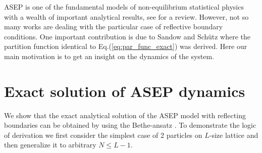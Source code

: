 \documentclass[aps,showpacs,twocolumn,floatfix,prx,superscriptaddress]{revtex4-1}
\begin{document}
ASEP is one of the fundamental models of non-equilibrium statistical physics with a wealth of important analytical results, see \cite{Derrida1998} for a review. However, not so many works are dealing with the particular case of reflective boundary conditions. One important contribution is due to Sandow and Sch\"{u}tz \cite{Sandow1994} where the partition function identical to Eq.(\ref{eq:par_func_exact}) was derived. Here our main motivation is to get an insight on the dynamics of the system. 

\section{Exact solution of ASEP dynamics}
We show that the exact analytical solution of the ASEP model with reflecting boundaries can be obtained by using the Bethe-ansatz \cite{Simon2009,Batchelor2007,Mallick2011}. To demonstrate the logic of derivation we first consider the simplest case of 2 particles on $L$-size lattice and then generalize it to arbitrary $N\leq L-1$.
\end{document}
